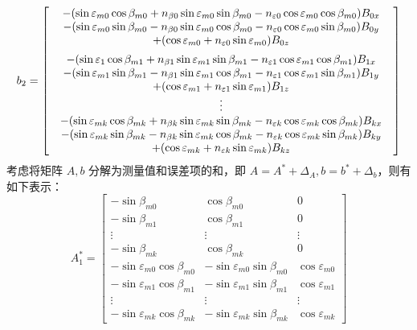 \begin{equation}
	b_2 = \left[\begin{array}{c}
		\vspace{5pt} \begin{array}{c}
			-(\sin\varepsilon_{m0}\cos\beta_{m0} +n_{\beta 0} \sin\varepsilon_{m0}\sin\beta_{m0} -n_{\varepsilon 0}\cos\varepsilon_{m0}\cos\beta_{m0})B_{0x} \\
			-(\sin\varepsilon_{m0}\sin\beta_{m0} -n_{\beta 0}\sin\varepsilon_{m0}\cos\beta_{m0} -n_{\varepsilon 0} \cos\varepsilon_{m0}\sin\beta_{m0})B_{0y} \\
			+(\cos\varepsilon_{m0} + n_{\varepsilon 0}\sin\varepsilon_{m0})B_{0z}
		\end{array} \\
		\begin{array}{c}
			-(\sin\varepsilon_{1}\cos\beta_{m1} +n_{\beta 1} \sin\varepsilon_{m1}\sin\beta_{m1} -n_{\varepsilon 1}\cos\varepsilon_{m1}\cos\beta_{m1})B_{1x} \\
			-(\sin\varepsilon_{m1}\sin\beta_{m1} -n_{\beta 1}\sin\varepsilon_{m1}\cos\beta_{m1} -n_{\varepsilon 1} \cos\varepsilon_{m1}\sin\beta_{m1})B_{1y} \\
			+(\cos\varepsilon_{m1} + n_{\varepsilon 1}\sin\varepsilon_{m1})B_{1z}
		\end{array} \\
		\vdots \\
		\begin{array}{c}
			-(\sin\varepsilon_{mk}\cos\beta_{mk} +n_{\beta k} \sin\varepsilon_{mk}\sin\beta_{mk} -n_{\varepsilon k}\cos\varepsilon_{mk}\cos\beta_{mk})B_{kx} \\
			-(\sin\varepsilon_{mk}\sin\beta_{mk} -n_{\beta k}\sin\varepsilon_{mk}\cos\beta_{mk} -n_{\varepsilon k} \cos\varepsilon_{mk}\sin\beta_{mk})B_{ky} \\
			+(\cos\varepsilon_{mk} + n_{\varepsilon k}\sin\varepsilon_{mk})B_{kz}
		\end{array}
	\end{array}\right]
\end{equation}
考虑将矩阵 $A,b$ 分解为测量值和误差项的和，即 $A = A^* + \Delta_A,b = b^* + \Delta_b$，则有如下表示：
\begin{equation}
	A_{1}^* = \left[\begin{array}{ccc}
		-\sin\beta_{m0} & \cos\beta_{m0} & 0 \\
		-\sin\beta_{m1} & \cos\beta_{m1} & 0 \\
		\vdots & \vdots & \vdots \\
		-\sin\beta_{mk} & \cos\beta_{mk} & 0 \\ \hline 
		-\sin\varepsilon_{m0}\cos\beta_{m0} & -\sin\varepsilon_{m0}\sin\beta_{m0} & \cos\varepsilon_{m0} \\
		-\sin\varepsilon_{m1}\cos\beta_{m1} & -\sin\varepsilon_{m1}\sin\beta_{m1} & \cos\varepsilon_{m1} \\
		\vdots & \vdots & \vdots \\
		-\sin\varepsilon_{mk}\cos\beta_{mk} & -\sin\varepsilon_{mk}\sin\beta_{mk} & \cos\varepsilon_{mk} 
	\end{array}\right]
\end{equation}
